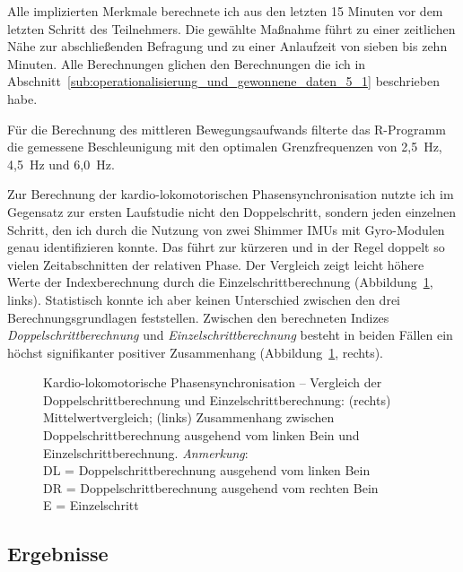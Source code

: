 Alle implizierten Merkmale berechnete ich aus den letzten 15 Minuten vor dem letzten Schritt des Teilnehmers. Die gewählte Maßnahme führt zu einer zeitlichen Nähe zur abschließenden Befragung und zu einer Anlaufzeit von sieben bis zehn Minuten. Alle Berechnungen glichen den Berechnungen die ich in Abschnitt~\ref{sub:operationalisierung_und_gewonnene_daten_5_1} beschrieben habe.

Für die Berechnung des mittleren Bewegungsaufwands filterte das R-Programm die gemessene Beschleunigung mit den optimalen Grenzfrequenzen von 2,5~Hz, 4,5~Hz und 6,0~Hz. 

Zur Berechnung der kardio-lokomotorischen Phasensynchronisation nutzte ich im Gegensatz zur ersten Laufstudie nicht den Doppelschritt, sondern jeden einzelnen Schritt, den ich durch die Nutzung von zwei Shimmer \acp{IMU} mit Gyro-Modulen genau identifizieren konnte. Das führt zur kürzeren und in der Regel doppelt so vielen Zeitabschnitten der relativen Phase. Der Vergleich zeigt leicht höhere Werte der Indexberechnung durch die Einzelschrittberechnung (Abbildung~\ref{fig:index_vergleich}, links). Statistisch konnte ich aber keinen Unterschied zwischen den drei Berechnungsgrundlagen feststellen. Zwischen den berechneten Indizes \emph{Doppelschrittberechnung} und \emph{Einzelschrittberechnung} besteht in beiden Fällen ein höchst signifikanter positiver Zusammenhang (Abbildung~\ref{fig:index_vergleich}, rechts). 
\begin{figure}
	[!htb]  \caption[Kardio-lokomotorische Phasensynchronisation: Vergleich der Doppelschrittberechnung und Einzelschrittberechnung]{Kardio-lokomotorische Phasensynchronisation -- Vergleich der Doppelschrittberechnung und Einzelschrittberechnung: (rechts) Mittelwertvergleich; (links) Zusammenhang zwischen Doppelschrittberechnung ausgehend vom linken Bein und Einzelschrittberechnung. \emph{Anmerkung}: \\
	\hspace{
	\textwidth}DL = Doppelschrittberechnung ausgehend vom linken Bein \\
	\hspace{
	\textwidth}DR = Doppelschrittberechnung ausgehend vom rechten Bein \\
	\hspace{
	\textwidth}E = Einzelschritt} \label{fig:index_vergleich} 
\end{figure}

\subsection{Ergebnisse} 

